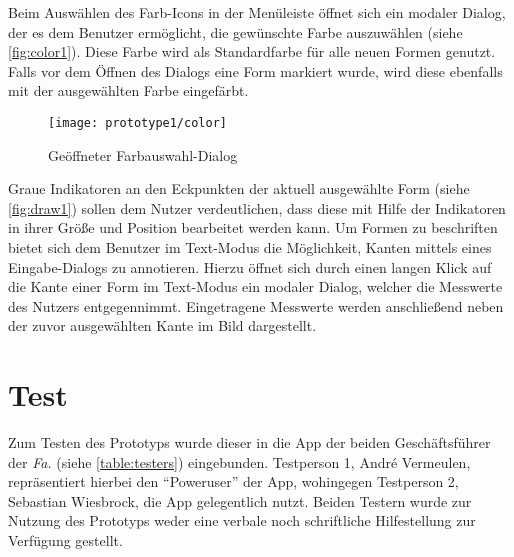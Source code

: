 Beim Auswählen des Farb-Icons in der Menüleiste öffnet sich ein modaler Dialog, der es dem Benutzer ermöglicht, die gewünschte Farbe auszuwählen (siehe \autoref{fig:color1}).
Diese Farbe wird als Standardfarbe für alle neuen Formen genutzt.
Falls vor dem Öffnen des Dialogs eine Form markiert wurde, wird diese ebenfalls mit der ausgewählten Farbe eingefärbt. \\

\begin{figure}[h]
  \centering
  \texttt{[image: prototype1/color]}
  \caption{Geöffneter Farbauswahl-Dialog}
  \label{fig:color1}
\end{figure}

Graue Indikatoren an den Eckpunkten der aktuell ausgewählte Form (siehe \autoref{fig:draw1}) sollen dem Nutzer verdeutlichen, dass diese mit Hilfe der Indikatoren in ihrer Größe und Position bearbeitet werden kann.
Um Formen zu beschriften bietet sich dem Benutzer im Text-Modus die Möglichkeit, Kanten mittels eines Eingabe-Dialogs zu annotieren.
Hierzu öffnet sich durch einen langen Klick auf die Kante einer Form im Text-Modus ein modaler Dialog, welcher die Messwerte des Nutzers entgegennimmt.
Eingetragene Messwerte werden anschließend neben der zuvor ausgewählten Kante im Bild dargestellt. 


\section{Test}\label{sec:test1}
Zum Testen des Prototyps wurde dieser in die App der beiden Geschäftsführer der \emph{Fa.} \vr{} (siehe \autoref{table:testers}) eingebunden.
Testperson 1, André Vermeulen, repräsentiert hierbei den ``Poweruser'' der App, wohingegen Testperson 2, Sebastian Wiesbrock, die App gelegentlich nutzt.
Beiden Testern wurde zur Nutzung des Prototyps weder eine verbale noch schriftliche Hilfestellung zur Verfügung gestellt. \\

